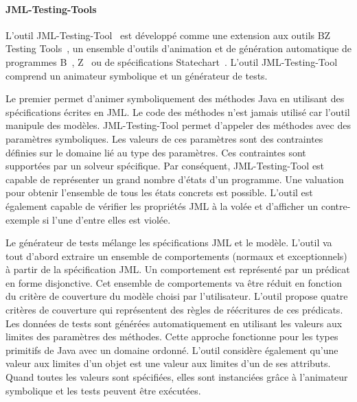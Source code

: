 \paragraph{JML-Testing-Tools} L'outil JML-Testing-Tool~ est développé comme une extension aux outils BZ Testing
Tools~, un ensemble d'outils d'animation et de génération
automatique de programmes B~, Z~ ou de
spécifications Statechart~. L'outil JML-Testing-Tool comprend un
animateur symbolique et un générateur de tests.

Le premier permet d'animer symboliquement des méthodes Java en utilisant des
spécifications écrites en JML. Le code des méthodes n'est jamais utilisé car
l'outil manipule des modèles. JML-Testing-Tool permet d'appeler des méthodes
avec des paramètres symboliques. Les valeurs de ces paramètres sont des
contraintes définies sur le domaine lié au type des paramètres. Ces contraintes
sont supportées par un solveur spécifique. Par conséquent, JML-Testing-Tool est
capable de représenter un grand nombre d'états d'un programme. Une valuation
pour obtenir l'ensemble de tous les états concrets est possible. L'outil est
également capable de vérifier les propriétés JML à la volée et d'afficher un
contre-exemple si l'une d'entre elles est violée.

Le générateur de tests mélange les spécifications JML et le modèle. L'outil va
tout d'abord extraire un ensemble de comportements (normaux et exceptionnels) à
partir de la spécification JML. Un comportement est représenté par un prédicat
en forme disjonctive. Cet ensemble de comportements va être réduit en fonction
du critère de couverture du modèle choisi par l'utilisateur. L'outil propose
quatre critères de couverture qui représentent des règles de réécritures de ces
prédicats. Les données de tests sont générées automatiquement en utilisant les
valeurs aux limites des paramètres des méthodes. Cette approche fonctionne pour
les types primitifs de Java avec un domaine ordonné. L'outil considère également
qu'une valeur aux limites d'un objet est une valeur aux limites d'un de ses
attributs. Quand toutes les valeurs sont spécifiées, elles sont instanciées
grâce à l'animateur symbolique et les tests peuvent être exécutées.

